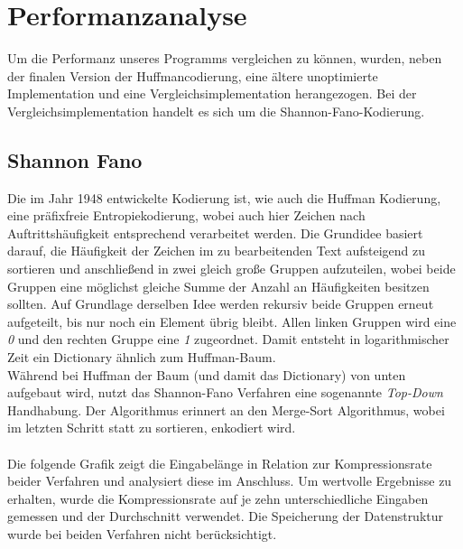 \documentclass[course=erap]{aspdoc}
\begin{document}
\section{Performanzanalyse}

Um die Performanz unseres Programms vergleichen zu können, wurden, neben der finalen Version der Huffmancodierung, eine ältere unoptimierte Implementation und eine Vergleichsimplementation herangezogen. Bei der Vergleichsimplementation handelt es sich um die Shannon-Fano-Kodierung.\cite{xie-no-date}

\subsection{Shannon Fano}
Die im Jahr 1948 entwickelte Kodierung ist, wie auch die Huffman Kodierung, eine präfixfreie Entropiekodierung, wobei auch hier Zeichen nach Auftrittshäufigkeit entsprechend verarbeitet werden. Die Grundidee basiert darauf, die Häufigkeit der Zeichen im zu bearbeitenden Text aufsteigend zu sortieren und anschließend in zwei gleich große Gruppen aufzuteilen, wobei beide Gruppen eine möglichst gleiche Summe der Anzahl an Häufigkeiten besitzen sollten. Auf Grundlage derselben Idee werden rekursiv beide Gruppen erneut aufgeteilt, bis nur noch ein Element übrig bleibt. Allen linken Gruppen wird eine \textit{0} und den rechten Gruppe eine \textit{1} zugeordnet. Damit entsteht in logarithmischer Zeit ein Dictionary ähnlich zum Huffman-Baum.\\
Während bei Huffman der Baum (und damit das Dictionary) von unten aufgebaut wird, nutzt das Shannon-Fano Verfahren eine sogenannte \textit{Top-Down} Handhabung. Der Algorithmus erinnert an den Merge-Sort Algorithmus, wobei im letzten Schritt statt zu sortieren, enkodiert wird.\\\\
Die folgende Grafik zeigt die Eingabelänge in Relation zur Kompressionsrate beider Verfahren und analysiert diese im Anschluss. Um wertvolle Ergebnisse zu erhalten, wurde die Kompressionsrate auf je zehn unterschiedliche Eingaben gemessen und der Durchschnitt verwendet. Die Speicherung der Datenstruktur wurde bei beiden Verfahren nicht berücksichtigt.\\
\begin{center}
\end{center}
\end{document}
